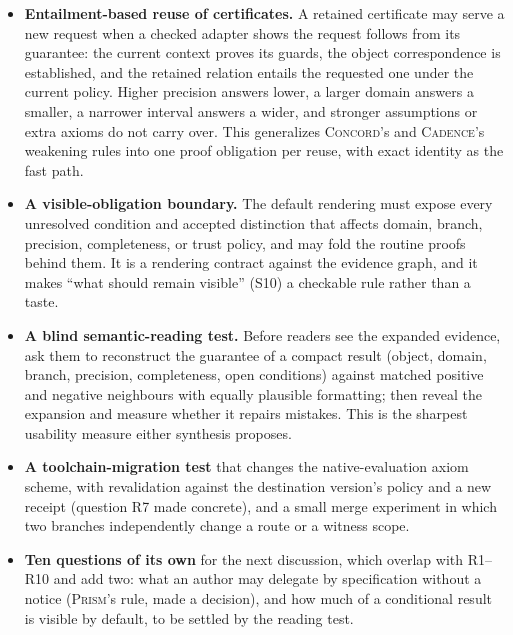 \documentclass[11pt,a4paper]{article}
\newcommand{\Cd}{\textsc{Cadence}}
\newcommand{\Cc}{\textsc{Concord}}
\newcommand{\Pm}{\textsc{Prism}}
\theoremstyle{definition}
\begin{document}
\begin{itemize}
\item \textbf{Entailment-based reuse of certificates.} A retained certificate may serve a new request when a checked adapter shows the request follows from its guarantee: the current context proves its guards, the object correspondence is established, and the retained relation entails the requested one under the current policy. Higher precision answers lower, a larger domain answers a smaller, a narrower interval answers a wider, and stronger assumptions or extra axioms do not carry over. This generalizes \Cc's and \Cd's weakening rules into one proof obligation per reuse, with exact identity as the fast path.
\item \textbf{A visible-obligation boundary.} The default rendering must expose every unresolved condition and accepted distinction that affects domain, branch, precision, completeness, or trust policy, and may fold the routine proofs behind them. It is a rendering contract against the evidence graph, and it makes ``what should remain visible'' (S10) a checkable rule rather than a taste.
\item \textbf{A blind semantic-reading test.} Before readers see the expanded evidence, ask them to reconstruct the guarantee of a compact result (object, domain, branch, precision, completeness, open conditions) against matched positive and negative neighbours with equally plausible formatting; then reveal the expansion and measure whether it repairs mistakes. This is the sharpest usability measure either synthesis proposes.
\item \textbf{A toolchain-migration test} that changes the native-evaluation axiom scheme, with revalidation against the destination version's policy and a new receipt (question R7 made concrete), and a small merge experiment in which two branches independently change a route or a witness scope.
\item \textbf{Ten questions of its own} for the next discussion, which overlap with R1--R10 and add two: what an author may delegate by specification without a notice (\Pm's rule, made a decision), and how much of a conditional result is visible by default, to be settled by the reading test.
\end{itemize}
\end{document}
